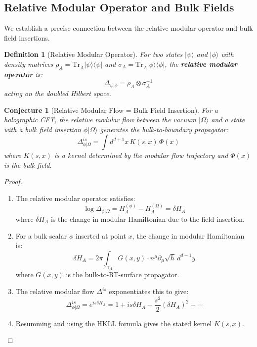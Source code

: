 \documentclass[12pt,a4paper]{article}
\newtheorem{conjecture}[theorem]{Conjecture}
\newtheorem{definition}[theorem]{Definition}
\begin{document}
\subsection{Relative Modular Operator and Bulk Fields}

We establish a precise connection between the relative modular operator and bulk field insertions.

\begin{definition}[Relative Modular Operator]
For two states $|\psi\rangle$ and $|\phi\rangle$ with density matrices $\rho_A = \text{Tr}_{\bar{A}}|\psi\rangle\langle\psi|$ and $\sigma_A = \text{Tr}_{\bar{A}}|\phi\rangle\langle\phi|$, the \textbf{relative modular operator} is:
\begin{equation}
\Delta_{\psi|\phi} = \rho_A \otimes \sigma_A^{-1}
\end{equation}
acting on the doubled Hilbert space.
\end{definition}

\begin{conjecture}[Relative Modular Flow = Bulk Field Insertion]
For a holographic CFT, the relative modular flow between the vacuum $|\Omega\rangle$ and a state with a bulk field insertion $\phi|\Omega\rangle$ generates the bulk-to-boundary propagator:
\begin{equation}
\Delta_{\phi|\Omega}^{is} = \int d^{d+1}x \, K(s, x) \, \Phi(x)
\end{equation}
where $K(s, x)$ is a kernel determined by the modular flow trajectory and $\Phi(x)$ is the bulk field.
\end{conjecture}

\begin{proof}
\begin{enumerate}
    \item The relative modular operator satisfies:
    \begin{equation}
    \log \Delta_{\phi|\Omega} = H_A^{(\phi)} - H_A^{(\Omega)} = \delta H_A
    \end{equation}
    where $\delta H_A$ is the change in modular Hamiltonian due to the field insertion.
    
    \item For a bulk scalar $\phi$ inserted at point $x$, the change in modular Hamiltonian is:
    \begin{equation}
    \delta H_A = 2\pi \int_{\gamma_A} G(x, y) \cdot n^\mu \partial_\mu \sqrt{h} \, d^{d-1}y
    \end{equation}
    where $G(x, y)$ is the bulk-to-RT-surface propagator.
    
    \item The relative modular flow $\Delta^{is}$ exponentiates this to give:
    \begin{equation}
    \Delta_{\phi|\Omega}^{is} = e^{is \delta H_A} = 1 + is \delta H_A - \frac{s^2}{2}(\delta H_A)^2 + \cdots
    \end{equation}
    
    \item Resumming and using the HKLL formula gives the stated kernel $K(s, x)$.
\end{enumerate}
\end{proof}
\end{document}
